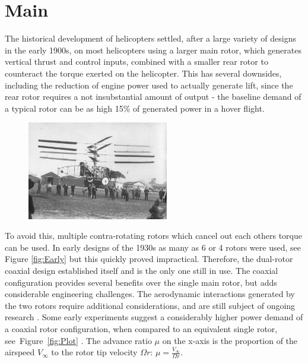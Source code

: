 \documentclass[11pt, a4paper]{scrartcl}
\begin{document}
\section{Main\label{Main}}
The historical development of helicopters settled, after a large variety of designs in the early 1900s, on most helicopters using a larger main rotor, which generates vertical thrust and control inputs, combined with a smaller rear rotor to counteract the torque exerted on the helicopter. This has several downsides, including the reduction of engine power used to actually generate lift, since the rear rotor requires a not insubstantial amount of output - the baseline demand of a typical rotor can be as high 15\% of generated power in a hover flight.\cite{dries-2003} 
\begin{figure}
    {\includegraphics[width=0.55\textwidth]{Early_Coaxial.jpg}}
\end{figure}
To avoid this, multiple contra-rotating rotors which cancel out each others torque can be used. In early designs of the 1930s as many as 6 or 4 rotors were used, see Figure \ref{fig:Early}\cite{Pescara-1930} but this quickly proved impractical.
Therefore, the dual-rotor coaxial design established itself and is the only one still in use. The coaxial configuration provides several benefits over the single main rotor, but adds considerable engineering challenges. The aerodynamic interactions generated by the two rotors require additional considerations, and are still subject of ongoing research \cite{Richard-2010}. Some early experiments suggest a considerably higher power demand of a coaxial rotor configuration, when compared to an equivalent single rotor, \mbox{see Figure \ref{fig:Plot}} \cite{leishman-2000}. The advance ratio $\mu$ on the x-axis is the proportion of the airspeed $V_\infty$ to the rotor tip velocity $\Omega r$:
\begin{math}
    \mu = \frac{V_\infty}{\Omega r}
\end{math}. 
\end{document}
